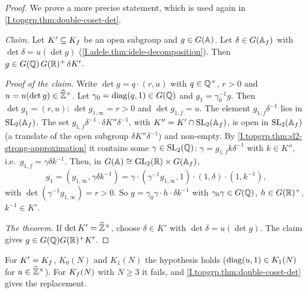 \begin{theorem}
\end{theorem}
\begin{proof}
We prove a more precise statement, which is used again in \cref{I.topgrp.thm:double-coset-det}.

\emph{Claim.} Let $K'\subseteq K_f$ be an open subgroup and $g\in G(\mathbb{A})$. Let $\delta\in G(\mathbb{A}_f)$ with
$\det\delta=u(\det g)$ (\cref{I.adele.thm:idele-decomposition}). Then $g\in G(\mathbb{Q})\,G(\mathbb{R})^+\,\delta K'$.

\emph{Proof of the claim.} Write $\det g=q\cdot(r,u)$ with $q\in\mathbb{Q}^\times$, $r>0$ and $u=u(\det g)\in\widehat{\mathbb{Z}}^\times$. Let
$\gamma_0=\operatorname{diag}(q,1)\in G(\mathbb{Q})$ and $g_1=\gamma_0^{-1}g$. Then $\det g_1=(r,u)$: $\det g_{1,\infty}=r>0$ and
$\det g_{1,f}=u$. The element $g_{1,f}\delta^{-1}$ lies in $\mathrm{SL}_2(\mathbb{A}_f)$. The set
$g_{1,f}\delta^{-1}\cdot\delta K''\delta^{-1}$, with $K''=K'\cap\mathrm{SL}_2(\mathbb{A}_f)$, is open in $\mathrm{SL}_2(\mathbb{A}_f)$ (a translate of
the open subgroup $\delta K''\delta^{-1}$) and non-empty. By \cref{I.topgrp.thm:sl2-strong-approximation} it contains
some $\gamma\in\mathrm{SL}_2(\mathbb{Q})$: $\gamma=g_{1,f}k\delta^{-1}$ with $k\in K''$, i.e.\ $g_{1,f}=\gamma\delta k^{-1}$. Then, in
$G(\mathbb{A})\cong\mathrm{GL}_2(\mathbb{R})\times G(\mathbb{A}_f)$,
\[
  g_1=(g_{1,\infty},\gamma\delta k^{-1})=\gamma\cdot(\gamma^{-1}g_{1,\infty},1)\cdot(1,\delta)\cdot(1,k^{-1}),
\]
with $\det(\gamma^{-1}g_{1,\infty})=r>0$. So $g=\gamma_0\gamma\cdot h\cdot\delta k^{-1}$ with $\gamma_0\gamma\in G(\mathbb{Q})$,
$h\in G(\mathbb{R})^+$, $k^{-1}\in K'$.

\emph{The theorem.} If $\det K'=\widehat{\mathbb{Z}}^\times$, choose $\delta\in K'$ with $\det\delta=u(\det g)$. The claim gives
$g\in G(\mathbb{Q})G(\mathbb{R})^+K'$.
\end{proof}
\noindent For $K'=K_f$, $K_0(N)$ and $K_1(N)$ the hypothesis holds ($\operatorname{diag}(u,1)\in K_1(N)$ for $u\in\widehat{\mathbb{Z}}^\times$). For
$K_f(N)$ with $N\ge3$ it fails, and \cref{I.topgrp.thm:double-coset-det} gives the replacement.

